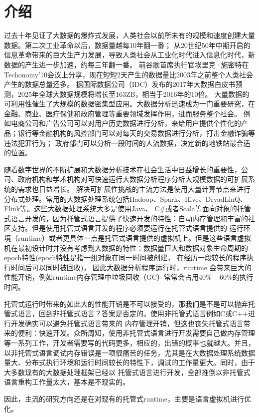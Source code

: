 
\chapter{介绍}
过去十年见证了大数据的爆炸式发展，人类社会以前所未有的规模和速度创建大量数据。第二次工业革命以后，数据量越每10年翻一番；
从20世纪50年中期开启的信息革命带来的巨大生产力发展，导致人类社会从工业化时代进入信息化时代，新数据的产生进一步加速，约每三年翻一番。
前谷歌首席执行官埃里克·施密特在Techonomy'10会议上分享，现在短短2天产生的数据量比2003年之前整个人类社会产生的数据总量还多。
据国际数据公司（IDC）发布的2017年大数据白皮书预测，2025年全球大数据规模将增长至163ZB，相当于2016年的10倍。
大量数据的可利用性催生了大规模的数据密集型应用。大数据分析迅速成为一门重要研究，在金融、商业、医疗保健和政府管理等重要领域发挥作用，进而服务整个社会。
例如电商公司和广告公司可以对用户历史数据进行分析，来给用户提供个性化的产品；银行等金融机构的风控部门可以对每天的交易数据进行分析，打击金融诈骗等违法犯罪行为；
政府部门可以分析一段时间的人流数据，决定新的地铁站最合适的位置。

随着数字世界的不断扩展和大数据分析技术在社会生活中日益增长的重要性，公司、政府机构和学术机构对可快速运行大数据分析程序分析大规模数据的可扩展系统的需求也日益增长。
解决可扩展性挑战的主流方法是使用大量计算节点来进行分布式处理。常用的大数据处理系统包括Hadoop、Spark、Hive、DryadLinQ、Flink等。这些大数据处理系统大多是使用Java、
C\#或者Scala等面向对象的托管式语言开发的，因为托管式语言提供了快速开发的特性：自动内存管理和丰富的社区支持。但是使用托管式语言开发的程序必须要运行在托管式语言提供的
运行环境（runtime）或者更具体一点是托管式语言提供的虚拟机上。但是这些语言虚拟机在最初设计时并没有考虑到大数据的特性：数据量巨大和数据对象生命周期的epoch特性\cite{nguyen2016yak}(epoch特性是指一组对象在同一时间被创建，
在经历一段较长的程序执行时间后可以同时被回收)， 因此大数据分析程序运行时，runtime
会带来巨大的性能开销，例如runtime内存管理中垃圾回收（GC）常常会占用40\% ~ 60\%的执行时间。

托管式运行时带来的如此大的性能开销是不可以接受的，那我们是不是可以抛弃托管式语言，回到非托管式语言？答案是否定的。使用非托管式语言例如C或C++进行开发确实可以避免托管式语言带来的
内存管理开销，但这也丧失托管式语言带来的便利：快速开发。众所周知，使用非托管式语言进行开发需要自己做内存管理等一系列工作，开发者需要写的代码更多，相应的，出错的概率也就越大。并且，
以非托管式语言调试内存错误是一项很痛苦的任务，尤其是在大数据处理系统数据量大、分布式执行环境和运行时间较长的特性下，调试的工作量更大。同时，由于大多数现有的大数据处理框架已经以
托管式语言进行开发，全部推倒以非托管式语言重构工作量太大，基本是不现实的。

因此，主流的研究方向还是在对现有的托管式runtime，主要是语言虚拟机进行优化。






